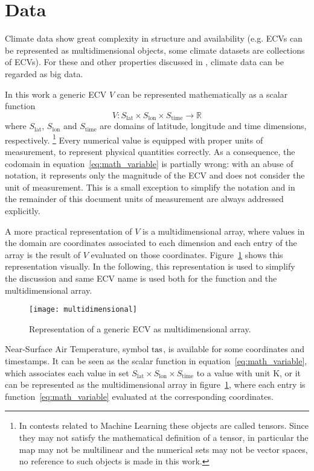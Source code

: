 \section{Data}
\label{sec:Data}
Climate data show great complexity in structure and availability (e.g. \glspl{ECV} can be represented as multidimensional objects, some climate datasets are collections of \glspl{ECV}). For these and other properties discussed in \cite{2014FaghmousABig}, climate data can be regarded as big data.

In this work a generic \gls{ECV} $V$ can be represented mathematically as a scalar function
\begin{equation}
  \label{eq:math_variable}
  V : S_\text{lat} \times S_\text{lon} \times S_\text{time} \to \mathbb{R}
\end{equation}
where $S_\text{lat}$, $S_\text{lon}$ and $S_\text{time}$ are domains of latitude, longitude and time dimensions, respectively.%
\footnote{In contests related to Machine Learning these objects are called tensors. Since they may not satisfy the mathematical definition of a tensor, in particular the map may not be multilinear and the numerical sets may not be vector spaces, no reference to such objects is made in this work.}
Every numerical value is equipped with proper units of measurement, to represent physical quantities correctly. As a consequence, the codomain in equation~\eqref{eq:math_variable} is partially wrong: with an abuse of notation, it represents only the magnitude of the \gls{ECV} and does not consider the unit of measurement. This is a small exception to simplify the notation and in the remainder of this document units of measurement are always addressed explicitly.

A more practical representation of $V$ is a multidimensional array, where values in the domain are coordinates associated to each dimension and each entry of the array is the result of $V$ evaluated on those coordinates. Figure~\ref{fig:multidimensional} shows this representation visually. In the following, this representation is used to simplify the discussion and same \gls{ECV} name is used both for the function and the multidimensional array.
\begin{figure}[h]
  \centering
  \texttt{[image: multidimensional]}
  \caption{Representation of a generic \gls{ECV} as multidimensional array.}
  \label{fig:multidimensional}
\end{figure}

\begin{example}
  Near-Surface Air Temperature, symbol $\mathrm{tas}$, is available for some coordinates and timestamps. It can be seen as the scalar function in equation~\eqref{eq:math_variable}, which associates each value in set $S_\text{lat} \times S_\text{lon} \times S_\text{time}$ to a value with unit \unit{\kelvin}, or it can be represented as the multidimensional array in figure~\ref{fig:multidimensional}, where each entry is function~\eqref{eq:math_variable} evaluated at the corresponding coordinates.
\end{example}

